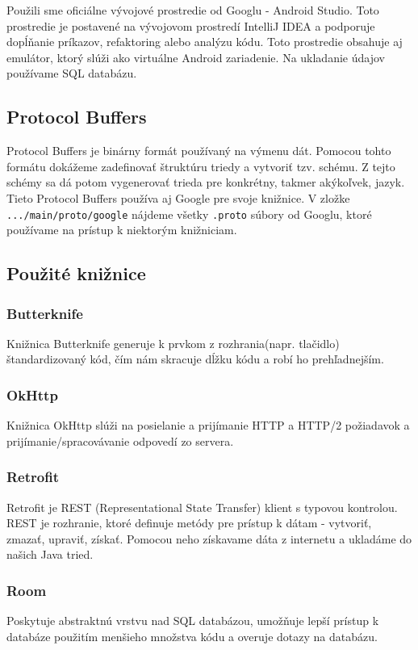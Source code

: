\documentclass{template/socthesis}
\begin{document}
Použili sme oficiálne vývojové prostredie od Googlu - Android Studio. Toto prostredie je postavené na vývojovom prostredí IntelliJ IDEA a podporuje dopĺňanie príkazov, refaktoring alebo analýzu kódu. Toto prostredie obsahuje aj emulátor, ktorý slúži ako virtuálne Android zariadenie. Na ukladanie údajov používame SQL databázu.

\subsection*{Protocol Buffers}
Protocol Buffers je binárny formát používaný na výmenu dát. Pomocou tohto formátu dokážeme zadefinovať štruktúru triedy a vytvoriť tzv. schému. Z tejto schémy sa dá potom vygenerovať trieda pre konkrétny, takmer akýkoľvek, jazyk. Tieto Protocol Buffers používa aj Google pre svoje knižnice. V zložke \texttt{.../main/proto/google} nájdeme všetky \texttt{.proto} súbory od Googlu, ktoré používame na prístup k niektorým knižniciam.


\subsection*{Použité knižnice}
\subsubsection{Butterknife}
Knižnica Butterknife generuje k prvkom z rozhrania(napr. tlačidlo) štandardizovaný kód, čím nám skracuje dĺžku kódu a robí ho prehľadnejším.
\subsubsection{OkHttp}
Knižnica OkHttp slúži na posielanie a prijímanie HTTP a HTTP/2 požiadavok a prijímanie/spracovávanie odpovedí zo servera.
\subsubsection{Retrofit}
Retrofit je REST (Representational State Transfer) klient s typovou kontrolou. REST je rozhranie, ktoré definuje metódy pre prístup k dátam - vytvoriť, zmazať, upraviť, získať. Pomocou neho získavame dáta z internetu a ukladáme do našich Java tried.
\subsubsection{Room}
Poskytuje abstraktnú vrstvu nad SQL databázou, umožňuje lepší prístup k databáze použitím menšieho množstva kódu a overuje dotazy na databázu.
\end{document}
